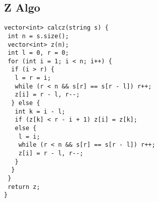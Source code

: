 \documentclass[a4paper,11pt,oneside]{article}
\begin{document}
\begin{multicols*}{\COLS}
\subsection{Z Algo}
\begin{lstlisting}
vector<int> calcz(string s) {
 int n = s.size();
 vector<int> z(n);
 int l = 0, r = 0;
 for (int i = 1; i < n; i++) {
  if (i > r) {
   l = r = i;
   while (r < n && s[r] == s[r - l]) r++;
   z[i] = r - l, r--;
  } else {
   int k = i - l;
   if (z[k] < r - i + 1) z[i] = z[k];
   else {
    l = i;
    while (r < n && s[r] == s[r - l]) r++;
    z[i] = r - l, r--;
   }
  }
 }
 return z;
}
\end{lstlisting}
\end{multicols*}

\end{document}

